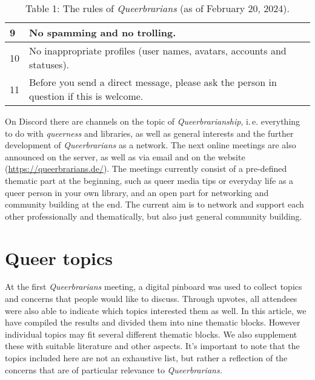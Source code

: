 \documentclass[a4paper,
fontsize=11pt,
oneside,
numbers=noperiodatend,
parskip=half-,
bibliography=totoc,
final
]{scrartcl}
\begin{document}
\begin{table}[h]
\begin{tabular}{|ll|}
\multicolumn{1}{|l|}{9}  & No spamming and no trolling.                                                                                                                                               \\ \hline
\multicolumn{1}{|l|}{10} & No inappropriate profiles (user names, avatars, accounts and statuses).                                                                                                    \\ \hline
\multicolumn{1}{|l|}{11} & Before you send a direct message, please ask the person in question if this is welcome.                                                                                    \\ \hline
\end{tabular}
\caption{Table 1: The rules of \emph{Queerbrarians} (as of February 20, 2024).}
\end{table}

On Discord there are channels on the topic of \emph{Queerbrarianship},
i.\,e. everything to do with \emph{queerness} and libraries, as well as
general interests and the further development of \emph{Queerbrarians} as
a network. The next online meetings are also announced on the server, as
well as via email and on the website (\url{https://queerbrarians.de/}).
The meetings currently consist of a pre-defined thematic part at the
beginning, such as queer media tips or everyday life as a queer person
in your own library, and an open part for networking and community
building at the end. The current aim is to network and support each
other professionally and thematically, but also just general community
building.

\hypertarget{queer-topics}{%
\section{Queer topics}\label{queer-topics}}

At the first \emph{Queerbrarians} meeting, a digital pinboard was used
to collect topics and concerns that people would like to discuss.
Through upvotes, all attendees were also able to indicate which topics
interested them as well. In this article, we have compiled the results
and divided them into nine thematic blocks. However individual topics
may fit several different thematic blocks. We also supplement these with
suitable literature and other aspects. It's important to note that the
topics included here are not an exhaustive list, but rather a reflection
of the concerns that are of particular relevance to
\emph{Queerbrarians.}
\end{document}
